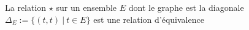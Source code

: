La relation $\star$ sur un ensemble $E$ dont le graphe est la diagonale $\Delta_E:=\{(t,t)\:|\: t\in E\}$ est une relation d'équivalence

\begin{reponses}
\end{reponses}

